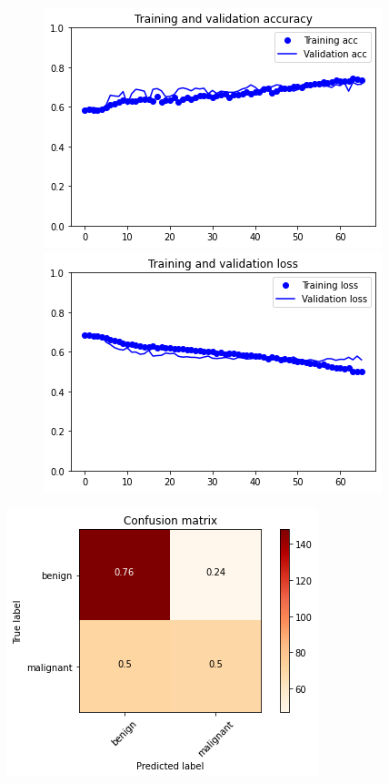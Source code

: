 \documentclass{article}
\begin{document}
\begin{figure}[h]
    \centering
    \begin{minipage}{0.45\textwidth}
        \centering
        \includegraphics[scale=0.46]{./img/scratchVal1_2.png}
    \end{minipage}\hfill
    \begin{minipage}{0.45\textwidth}
        \centering
        \includegraphics[scale=0.46]{./img/scratchLoss1_2.png}
    \end{minipage}
\end{figure}

\begin{center}
\begin{minipage}{0.45\textwidth}
        \includegraphics[scale=0.6]{./img/cmScratch1_2.png}
    \end{minipage}
\end{center}
\end{document}
